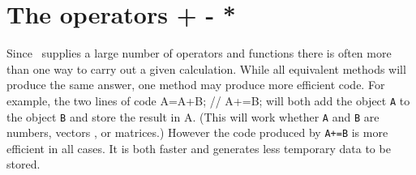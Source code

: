 \documentclass[12pt]{book}
\begin{document}
\endchapter


\htmlnewfile 
\def\leftset#1{\quad #1 \hskip 1000pt minus 1fil}
\section{The operators  + - * } 
Since \AD\ supplies a large number of operators and functions
there is often more than one way to carry out a given calculation.
While all equivalent methods will produce the same answer,
one method may produce more efficient code. For example,
the two lines of code
\beginexample
 A=A+B;
 //
 A+=B;
\endexample
\noindent will both add the object {\tt A}   to the object {\tt B}
and store the result in A. (This will work whether {\tt A} and {\tt B}
 are numbers,
vectors , or matrices.) However the code produced by {\tt A+=B}  
is more efficient in all cases. It is both faster and generates
less temporary data to be stored.
\end{document}
